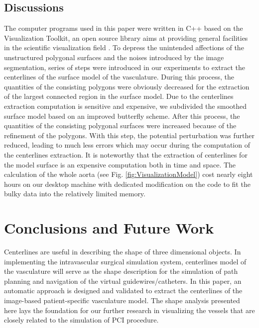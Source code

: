 \subsection{Discussions}

The computer programs used in this paper were written in C++ based on the Visualization Toolkit, an open source library aims at providing general facilities in the scientific visualization field \cite{Schroeder2000VTK}. %
To depress the unintended affections of the unstructured polygonal surfaces and the noises introduced by the image segmentation, series of steps were introduced in our experiments to extract the centerlines of the surface model of the vasculature. %
During this process, the quantities of the consisting polygons were obviously decreased for the extraction of the largest connected region in the surface model.
Due to the centerlines extraction computation is sensitive and expensive, we subdivided the smoothed surface model based on an improved butterfly scheme.
After this process, the quantities of the consisting polygonal surfaces were increased because of the refinement of the polygons.
With this step, the potential perturbation was further reduced, leading to much less errors which may occur during the computation of the centerlines extraction.
It is noteworthy that the extraction of centerlines for the model surface is an expensive computation both in time and space.
The calculation of the whole aorta (see Fig. \ref{fig:VisualizationModel}) cost nearly eight hours on our desktop machine with dedicated modification on the code to fit the bulky data into the relatively limited memory. %

\section{Conclusions and Future Work}

Centerlines are useful in describing the shape of three dimensional objects.
In implementing the intravascular surgical simulation system, centerlines model of the vasculature will serve as the shape description for the simulation of path planning and navigation of the virtual guidewires/catheters.
In this paper, an automatic approach is designed and validated to extract the centerlines of the image-based patient-specific vasculature model.
The shape analysis presented here lays the foundation for our further research in visualizing the vessels that are closely related to the simulation of PCI procedure.

